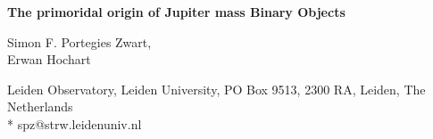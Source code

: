 \documentclass[submission,phys]{lib/SciPost}
\begin{document}
 

\begin{center}{\Large \textbf{
      The primoridal origin of Jupiter mass Binary Objects
    }}
\end{center} 

\begin{center}
  Simon F. Portegies Zwart,\\
  Erwan Hochart
\end{center} 

\begin{center}
Leiden Observatory, Leiden University, PO Box 9513, 2300 RA, Leiden, The Netherlands\\
* spz@strw.leidenuniv.nl
\end{center}

\end{document}
